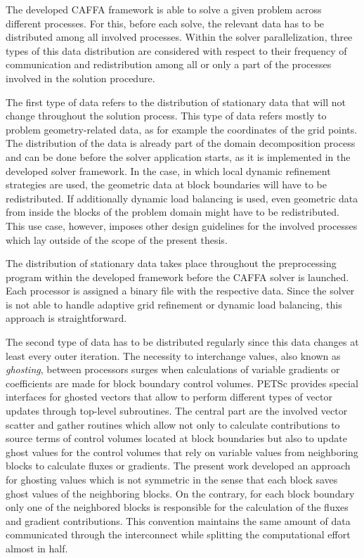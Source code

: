 The developed CAFFA framework is able to solve a given problem across different processes. For this, before each solve, the relevant data has to be distributed among all involved processes. Within the solver parallelization, three types of this data distribution are considered with respect to their frequency of communication and redistribution among all or only a part of the processes involved in the solution procedure. 

The first type of data refers to the distribution of stationary data that will not change throughout the solution process. This type of data refers mostly to problem geometry-related data, as for example the coordinates of the grid points. The distribution of the data is already part of the domain decomposition process and can be done before the solver application starts, as it is implemented in the developed solver framework. In the case, in which local dynamic refinement strategies are used, the geometric data at block boundaries will have to be redistributed. If additionally dynamic load balancing is used, even geometric data from inside the blocks of the problem domain might have to be redistributed. This use case, however, imposes other design guidelines for the involved processes which lay outside of the scope of the present thesis.

The distribution of stationary data takes place throughout the preprocessing program within the developed framework before the CAFFA solver is launched. Each processor is assigned a binary file with the respective data. Since the solver is not able to handle adaptive grid refinement or dynamic load balancing, this approach is straightforward.

The second type of data has to be distributed regularly since this data changes at least every outer iteration. The necessity to interchange values, also known as \emph{ghosting}, between processors surges when calculations of variable gradients or coefficients are made for block boundary control volumes. PETSc provides special interfaces for ghosted vectors that allow to perform different types of vector updates through top-level subroutines. The central part are the involved vector scatter and gather routines which allow not only to calculate contributions to source terms of control volumes located at block boundaries but also to update ghost values for the control volumes that rely on variable values from neighboring blocks to calculate fluxes or gradients. The present work developed an approach for ghosting values which is not symmetric in the sense that each block saves ghost values of the neighboring blocks. On the contrary, for each block boundary only one of the neighbored blocks is responsible for the calculation of the fluxes and gradient contributions. This convention maintains the same amount of data communicated through the interconnect while splitting the computational effort almost in half.

